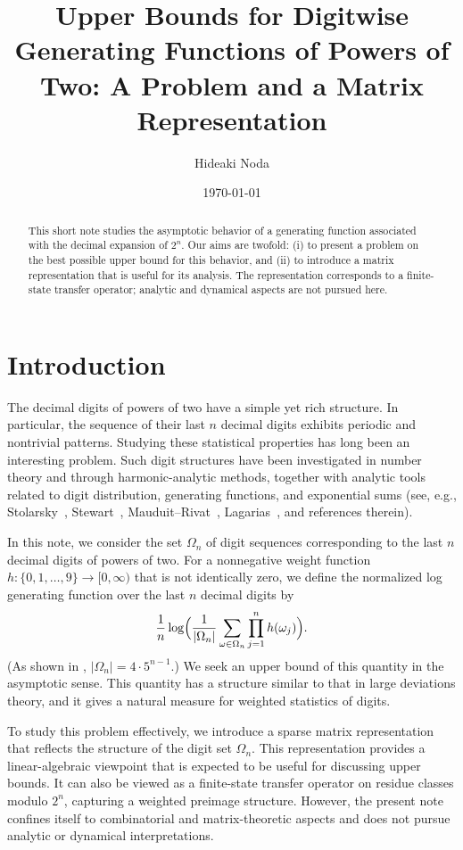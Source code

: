 \documentclass[11pt,a4paper]{article}
\title{Upper Bounds for Digitwise Generating Functions of Powers of Two: A Problem and a Matrix Representation}
\author{Hideaki Noda}
\date{\today}
\theoremstyle{plain}
\begin{document}
\maketitle
\begin{abstract}
This short note studies the asymptotic behavior of a generating function associated with the decimal expansion of \(2^n\).
Our aims are twofold:
(i) to present a problem on the best possible upper bound for this behavior, and
(ii) to introduce a matrix representation that is useful for its analysis.
The representation corresponds to a finite-state transfer operator; analytic and dynamical aspects are not pursued here.
\end{abstract}


\section{Introduction}\label{sec:intro}
The decimal digits of powers of two have a simple yet rich structure.
In particular, the sequence of their last \(n\) decimal digits exhibits periodic and nontrivial patterns.
Studying these statistical properties has long been an interesting problem.
Such digit structures have been investigated in number theory and through harmonic-analytic methods, together with analytic tools related to digit distribution, generating functions, and exponential sums
(see, e.g., Stolarsky~\cite{Stolarsky1977,Stolarsky1978}, Stewart~\cite{Stewart1980}, Mauduit--Rivat~\cite{MauduitRivat2010}, Lagarias~\cite{Lagarias2009}, and references therein).

In this note, we consider the set \(\Omega_n\) of digit sequences corresponding to the last \(n\) decimal digits of powers of two.
For a nonnegative weight function \(h:\{0,1,\dots,9\}\to[0,\infty)\) that is not identically zero, we define the normalized log generating function over the last $n$ decimal digits by
\begin{equation}\label{eq:lgf}
\frac{1}{n}\log \Bigl(
\frac{1}{|\Omega_n|}
\sum_{\omega\in\Omega_n} \prod_{j=1}^n h(\omega_j)
\Bigr).
\end{equation}
(As shown in , $|\Omega_n|=4\cdot5^{n-1}$.)
We seek an upper bound of this quantity in the asymptotic sense.
This quantity has a structure similar to that in large deviations theory, and it gives a natural measure for weighted statistics of digits.

To study this problem effectively, we introduce a sparse matrix representation that reflects the structure of the digit set \(\Omega_n\).
This representation provides a linear-algebraic viewpoint that is expected to be useful for discussing upper bounds.
It can also be viewed as a finite-state transfer operator on residue classes modulo \(2^n\),
capturing a weighted preimage structure.
However, the present note confines itself to combinatorial and matrix-theoretic aspects
and does not pursue analytic or dynamical interpretations.
\end{document}
